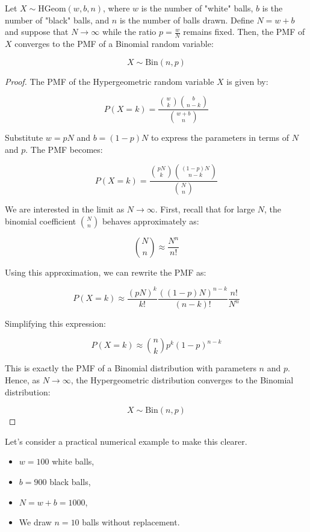 \begin{theorem}
    Let \( X \sim \text{HGeom}(w, b, n) \), where \( w \) is the number of "white" balls, \( b \) is the number of "black" balls, and \( n \) is the number of balls drawn. Define \( N = w + b \) and suppose that \( N \to \infty \) while the ratio \( p = \frac{w}{N} \) remains fixed. Then, the PMF of \( X \) converges to the PMF of a Binomial random variable:

    \[
    X \sim \text{Bin}(n, p)
    \]    
\end{theorem}

\begin{proof}
    The PMF of the Hypergeometric random variable \( X \) is given by:

    \[
    P(X = k) = \frac{\binom{w}{k} \binom{b}{n-k}}{\binom{w+b}{n}}
    \]
    
    Substitute \( w = pN \) and \( b = (1-p)N \) to express the parameters in terms of \( N \) and \( p \). The PMF becomes:
    
    \[
    P(X = k) = \frac{\binom{pN}{k} \binom{(1-p)N}{n-k}}{\binom{N}{n}}
    \]
    
    We are interested in the limit as \( N \to \infty \). First, recall that for large \( N \), the binomial coefficient \( \binom{N}{n} \) behaves approximately as:
    
    \[
    \binom{N}{n} \approx \frac{N^n}{n!}
    \]
    
    Using this approximation, we can rewrite the PMF as:
    
    \[
    P(X = k) \approx \frac{(pN)^k}{k!} \frac{((1-p)N)^{n-k}}{(n-k)!} \frac{n!}{N^n}
    \]
    
    Simplifying this expression:
    
    \[
    P(X = k) \approx \binom{n}{k} p^k (1-p)^{n-k}
    \]
    
    This is exactly the PMF of a Binomial distribution with parameters \( n \) and \( p \). Hence, as \( N \to \infty \), the Hypergeometric distribution converges to the Binomial distribution:
    
    \[
    X \sim \text{Bin}(n, p)
    \]
        
\end{proof}

Let's consider a practical numerical example to make this clearer.

\begin{itemize}
    \item \( w = 100 \) white balls,
    \item \( b = 900 \) black balls,
    \item \( N = w + b = 1000 \),
    \item We draw \( n = 10 \) balls without replacement.
\end{itemize}

